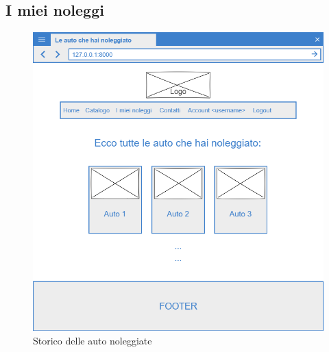 \documentclass[12pt,a4paperS]{report}
\begin{document}
\begin{normalsize}
			\subsection{I miei noleggi}
				\begin{figure}[H]
					\centering
					\includegraphics[width=1\textwidth, height=1\textheight, keepaspectratio]{Mockup/Storico_noleggi_utente.png}
					\caption{Storico delle auto noleggiate}
				\end{figure}
			

\end{normalsize}
\end{document}
